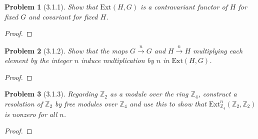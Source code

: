 \documentclass[10pt]{article}
\newcommand{\sk}{\vskip 10mm}
\newcommand{\bb}[1]{\mathbb{#1}}
\newcommand{\Ext}{\mathrm{Ext}}
\theoremstyle{plain}
\newtheorem{problem}{Problem}
\theoremstyle{remark}
\begin{document}
\begin{problem}[3.1.1]
  Show that $\Ext(H,G)$ is a contravariant functor of $H$ for fixed $G$ and
  covariant for fixed $H$.
\end{problem}

\begin{proof}
  
\end{proof}

\sk

\begin{problem}[3.1.2]
  Show that the maps $G\xrightarrow{n} G$ and $H\xrightarrow{n} H$ multiplying
  each element by the integer $n$ induce multiplication by $n$ in $\Ext(H,G)$.
\end{problem}

\begin{proof}
  
\end{proof}

\sk

\begin{problem}[3.1.3]
  Regarding $\bb{Z}_2$ as a module over the ring $\bb{Z}_4$, construct a
  resolution of $\bb{Z}_2$ by free modules over $\bb{Z}_4$ and use this to show
  that $\Ext_{\bb{Z}_4}^n(\bb{Z}_2,\bb{Z}_2)$ is nonzero for all $n$.
\end{problem}

\begin{proof}
  
\end{proof}

\end{document}
